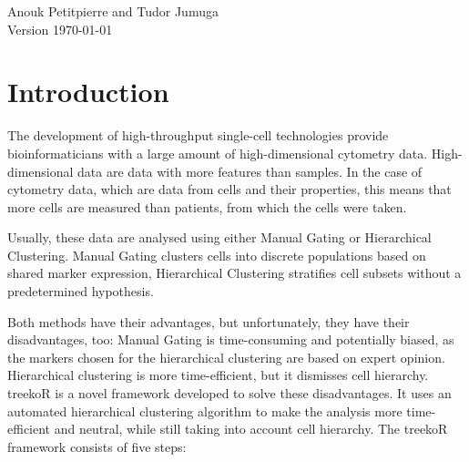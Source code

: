 \documentclass[11pt,a4paper,twoside]{report}\usepackage[]{graphicx}\usepackage[]{color}
\begin{document}
\graphicspath{{./figure/}}            %
\setcounter{tocdepth}{1}              %

\thispagestyle{empty}                 %
\begin{center}
  \vspace*{6cm}{\bfseries\Huge  %
  STA426 treekoR project\\[5mm]
  }
  \vfill

  \LARGE         Anouk Petitpierre and Tudor Jumuga\\[12mm]  %
  
  \normalsize    Version \today            %
\end{center}
\cleardoublepage

\thispagestyle{plain}
\tableofcontents
\cleardoublepage





\chapter{Introduction}

The development of high-throughput single-cell technologies provide bioinformaticians with a large amount of high-dimensional cytometry data. High-dimensional data are data with more features than samples. In the case of cytometry data, which are data from cells and their properties, this means that more cells are measured than patients, from which the cells were taken.

Usually, these data are analysed using either Manual Gating or Hierarchical Clustering. Manual Gating clusters cells into discrete populations based on shared marker expression, Hierarchical Clustering stratifies cell subsets without a predetermined hypothesis.

Both methods have their advantages, but unfortunately, they have their disadvantages, too: Manual Gating is time-consuming and potentially biased, as the markers chosen for the hierarchical clustering are based on expert opinion. Hierarchical clustering is more time-efficient, but it dismisses cell hierarchy. treekoR is a novel framework developed to solve these disadvantages. It uses an automated hierarchical clustering algorithm to make the analysis more time-efficient and neutral, while still taking into account cell hierarchy. The treekoR framework consists of five steps:
\end{document}
